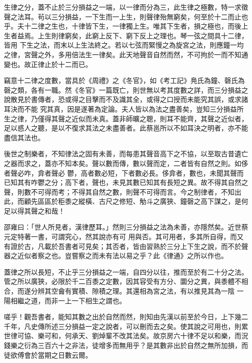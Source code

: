 \begin{pinyinscope}
 生律之分，蓋不止於三分損益之一端，以一律而分為三，此生律之極數，特一求徵聲之法耳。茍以三分損益，一下生而一上生，則聲律殆無窮矣，何至於十二而止也乎。夫十二律之生也，十律皆下生，一律獨上生。唯其下生者，損之極也，而後上生者益焉。上生則律窮矣，此窮上反下、窮下反上之理也。琴一弦之間具十二律，皆用
 下生之法，而末以上生法終之。若以七弦而緊慢之為旋宮之法，則應鐘一均之律，宮聲之外，多用倍法生一律矣。此天地聲音自然而然，不可拘於一而不知通變也。故正律止於十二而已。



 竊意十二律之度數，當具於《周禮》之《冬官》，如《考工記》鳧氏為鐘、磬氏為磬之類，各有一職。然《冬官》一篇既亡，則世無以考其度數之詳，而三分損益之說散見於書傳者，恐或得之目擊而不及識其全，或得之口授而未能究其誤，或求諸耳決而不能
 究其真，因是遂著為定論。夫人皆以為法之盡善矣，豈知三分損益所生之律，乃僅得其聲之近似而未真。蓋非師曠之聰，則耳不能齊，其聲之近似者，足以惑人之聽，是以不復求其法之未盡善者。此蔡邕所以不如耳決之明者，亦不能盡信其法也。



 後世之制樂者，不知律法之固有未善，而每患其聲音高下之不協，以至取古昔遺亡之器而求之，蓋亦不知本矣。聲以數而傳，數以聲而定，二者皆有自然之則。如侈者聲必咋，弇者聲必
 鬱，高者數必短，下者數必長。侈弇者，數也，未聞其聲而已知其有咋鬱之分；高下者，聲也，未見其數已知其有長短之異。故不得其自然之聲，則數不可得而考；不得其自然之數，則聲不可得而言。今之制律者，不知出此，而顧先區區於秬黍之縱橫、古尺之修短、觔斗之廣狹、鐘磬之高下謀之，是何足以得其聲之和哉！



 邵雍曰：「世人所見者，漢律歷耳。」然則三分損益之法為未善，亦隱然矣。近世蔡元定特著一書，可謂究心，然其說亦有可
 用與否。其可用者，多其所自得，而又有證於古，凡載於吾書者可見矣；其否者，皆由習熟於三分上下生之說，而不於聲器之近似者察之也。豈嘗察之而未有法以易之乎？此《律通》之所以作也。



 蓋律之所以長短，不止乎三分損益之一端，自四分以往，推而至於有二十分之法。管之所以廣狹，必限於千二百黍之定數，因其容受有方分、圜分之異，與黍體不相合，而遂分辨其空龠有實積、隙積之理。其還相為宮之法，有以推見其為一陰
 一陽相繼之道，而非一上一下相生之謂也。



 嗟乎！觀吾書者，能知其數之出於自然而然，則知由先漢以前至於今日，上下幾二千年，凡史傳所述三分損益一定之說者，可以刪而去之矣。使其說之可用也，則累世律可協、樂可和，何承天、劉焯輩不改其法矣。故京房六十律不足以和樂，而況錢樂之衍為三百六十之非法，徒增多而無用乎？是其數非出於自然之無所加損，而徒欲傅會於當期之日數云爾。




\end{pinyinscope}
